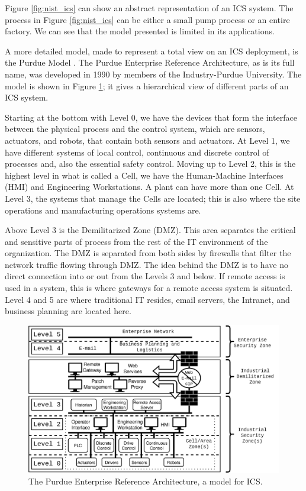 Figure \ref{fig:nist_ics} can show an abstract representation of an ICS system. The process in Figure \ref{fig:nist_ics} can be either a small pump process or an entire factory. We can see that the model presented is limited in its applications. 

A more detailed model, made to represent a total view on an ICS deployment, is the Purdue Model \cite{williams1992purdue}. The Purdue Enterprise Reference Architecture, as is its full name, was developed in 1990 by members of the Industry-Purdue University. The model is shown in Figure \ref{fig:perdue}; it gives a hierarchical view of different parts of an ICS system. 

Starting at the bottom with Level 0, we have the devices that form the interface between the physical process and the control system, which are sensors, actuators, and robots, that contain both sensors and actuators. At Level 1, we have different systems of local control, continuous and discrete control of processes and, also the essential safety control. Moving up to Level 2, this is the highest level in what is called a Cell, we have the Human-Machine Interfaces (HMI) and Engineering Workstations. A plant can have more than one Cell. At Level 3, the systems that manage the Cells are located; this is also where the site operations and manufacturing operations systems are. 

Above Level 3 is the Demilitarized Zone (DMZ). This area separates the critical and sensitive parts of process from the rest of the IT environment of the organization. The DMZ is separated from both sides by firewalls that filter the network traffic flowing through DMZ. The idea behind the DMZ is to have no direct connection into or out from the Levels 3 and below. If remote access is used in a system, this is where gateways for a remote access system is situated. Level 4 and 5 are where traditional IT resides, email servers, the Intranet, and business planning are located here.

\begin{figure}[h]
\centering
\includegraphics[width=\textwidth]{images/purdue.png}
\caption{The Purdue Enterprise Reference Architecture, a model for ICS.}
\label{fig:perdue}
\end{figure}

